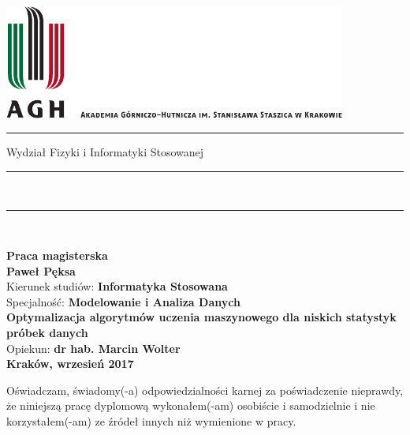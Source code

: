 
\thispagestyle{empty}
\includegraphics[height=37.5mm]{res/agh_logo.pdf}\\
\rule{30mm}{0pt}
{\large \textsf{Wydział Fizyki i Informatyki Stosowanej}}\\
\rule{\textwidth}{3pt}\\
\rule[2ex]
{\textwidth}{1pt}\\
\vspace{7ex}
\begin{center}
{\LARGE \bf \textsf{Praca magisterska}}\\
\vspace{13ex}
{\bf \Large \textsf{Paweł Pęksa}}\\
\vspace{3ex}
{\sf\small Kierunek studiów:} {\bf\small \textsf{Informatyka Stosowana}}\\
\vspace{1.5ex}
{\sf\small Specjalność:} {\bf\small \textsf{Modelowanie i Analiza Danych}}\\
\vspace{10ex}
{\bf \huge \textsf{Optymalizacja algorytmów uczenia maszynowego dla niskich statystyk próbek danych}}\\
\vspace{14ex}
{\Large Opiekun: \bf \textsf{dr hab. Marcin Wolter}}\\
\vspace{22ex}
{\large \bf \textsf{Kraków, wrzesień 2017}}
\end{center}

\newpage

{\sf Oświadczam, świadomy(-a) odpowiedzialności karnej za poświadczenie nieprawdy, że niniejszą pracę dyplomową wykonałem(-am) osobiście i samodzielnie i  nie korzystałem(-am) ze źródeł innych niż wymienione w pracy.}

